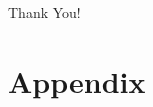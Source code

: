 \documentclass[aspectratio=169, t]{beamer}
\begin{document}
\begin{frame}[c]
    \begin{center}
        \Large Thank You!
    \end{center}
\end{frame}


\appendix

\renewcommand\thetable{\thesection.\arabic{table}}
\renewcommand\thefigure{\thesection.\arabic{figure}} 
\setcounter{table}{0}
\setcounter{figure}{0}

\section{Appendix}
\end{document}
